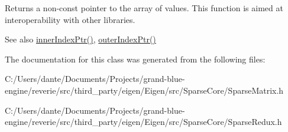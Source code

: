 \begin{DoxyReturn}{Returns}
a non-\/const pointer to the array of values. This function is aimed at interoperability with other libraries. 
\end{DoxyReturn}
\begin{DoxySeeAlso}{See also}
\mbox{\hyperlink{class_eigen_1_1_sparse_matrix_a8e9ef5d399d36fdd860ad05cb7a31455}{inner\+Index\+Ptr()}}, \mbox{\hyperlink{class_eigen_1_1_sparse_matrix_a9451af2795c1a5b97678272475e41422}{outer\+Index\+Ptr()}} 
\end{DoxySeeAlso}


The documentation for this class was generated from the following files\+:\begin{DoxyCompactItemize}
\item 
C\+:/\+Users/dante/\+Documents/\+Projects/grand-\/blue-\/engine/reverie/src/third\+\_\+party/eigen/\+Eigen/src/\+Sparse\+Core/Sparse\+Matrix.\+h\item 
C\+:/\+Users/dante/\+Documents/\+Projects/grand-\/blue-\/engine/reverie/src/third\+\_\+party/eigen/\+Eigen/src/\+Sparse\+Core/Sparse\+Redux.\+h\end{DoxyCompactItemize}
